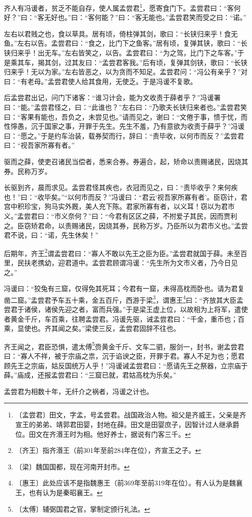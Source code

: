 \documentclass[12pt,UTF-8,openany,a4]{ctexbook}
\begin{document}
\begin{large}
    
    齐人有冯谖者，贫乏不能自存，使人属孟尝君\footnote{〔孟尝君〕\yiwen 田文，字孟，号孟尝君。战国政治人物。祖父是齐威王，父亲是齐宣王的弟弟、靖郭君田婴，封地在薛。田文是田婴庶子，因智计过人继承爵位。田文在齐湣王时为相。他好养士，据说有门客三千。}，愿寄食门下。孟尝君曰：“客何好？”曰：“客无好也。”曰：“客何能？”曰：“客无能也。”孟尝君笑而受之曰：“诺。”
    
    左右以君贱之也，食以草具。居有顷，倚柱弹其剑，歌曰：“长铗归来乎！食无鱼。”左右以告。孟尝君曰：“食之，比门下之鱼客。”居有顷，复弹其铗，歌曰：“长铗归来乎！出无车。”左右皆笑之，以告。孟尝君曰：“为之驾，比门下之车客。”于是乘其车，揭其剑，过其友曰：“孟尝君客我。”后有顷，复弹其剑铗，歌曰：“长铗归来乎！无以为家。”左右皆恶之，以为贪而不知足。孟尝君问：“冯公有亲乎？”对曰：“有老母。”孟尝君使人给其食用，无使乏。于是冯谖不复歌。
    
    后孟尝君出记，问门下诸客：“谁习计会，能为文收责于薛者乎？”冯谖署曰：“能。”孟尝君怪之，曰：“此谁也？”左右曰：“乃歌夫长铗归来者也。”孟尝君笑曰：“客果有能也，吾负之，未尝见也。”请而见之，谢曰：“文倦于事，愦于忧，而性懧愚，沉于国家之事，开罪于先生。先生不羞，乃有意欲为收责于薛乎？”冯谖曰：“愿之。”于是约车治装，载券契而行，辞曰：“责毕收，以何市而反？”孟尝君曰：“视吾家所寡有者。”
    
    驱而之薛，使吏召诸民当偿者，悉来合券。券遍合，起，矫命以责赐诸民，因烧其券。民称万岁。
    
    长驱到齐，晨而求见。孟尝君怪其疾也，衣冠而见之，曰：“责毕收乎？来何疾也！”曰：“收毕矣。”“以何市而反？”冯谖曰：“君云‘视吾家所寡有者’。臣窃计，君宫中积珍宝，狗马实外厩，美人充下陈。君家所寡有者，以义耳！窃以为君市义。”孟尝君曰：“市义奈何？”曰：“今君有区区之薛，不拊爱子其民，因而贾利之。臣窃矫君命，以责赐诸民，因烧其券，民称万岁。乃臣所以为君市义也。”孟尝君不说，曰：“诺，先生休矣！”
    
    后期年，齐王\footnote{〔齐王〕\yiwen 指齐湣王（前301年至前284年在位），齐宣王之子。}谓孟尝君曰：“寡人不敢以先王之臣为臣。”孟尝君就国于薛。未至百里，民扶老携幼，迎君道中。孟尝君顾谓冯谖：“先生所为文市义者，乃今日见之。”
    
    冯谖曰：“狡兔有三窟，仅得免其死耳；今君有一窟，未得高枕而卧也。请为君复凿二窟。”孟尝君予车五十乘，金五百斤，西游于梁\footnote{〔梁〕\yiwen 魏国国都，现在河南开封市。}，谓惠王\footnote{〔惠王〕\yiwen 此处应该不是指魏惠王（前369年至前319年在位）。有人认为是魏襄王，也有认为是秦昭襄王。}曰：“齐放其大臣孟尝君于诸侯，诸侯先迎之者，富而兵强。”于是梁王虚上位，以故相为上将军，遣使者黄金千斤，车百乘，往聘孟尝君。冯谖先驱，诫孟尝君曰：“千金，重币也；百乘，显使也。齐其闻之矣。”梁使三反，孟尝君固辞不往也。
    
    齐王闻之，君臣恐惧，遣太傅\footnote{〔太傅〕\yiwen 辅弼国君之官，掌制定颁行礼法。}赍黄金千斤、文车二驷，服剑一，封书，谢孟尝君曰：“寡人不祥，被于宗庙之祟，沉于谄谀之臣，开罪于君。寡人不足为也；愿君顾先王之宗庙，姑反国统万人乎！”冯谖诫孟尝君曰：“愿请先王之祭器，立宗庙于薛。”庙成，还报孟尝君曰：“三窟已就，君姑高枕为乐矣。”
    
    孟尝君为相数十年，无纤介之祸者，冯谖之计也。

\end{large}
\end{document}
